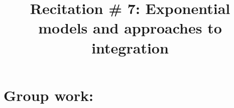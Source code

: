 \documentclass[handout]{ximera}
\title{Recitation \# 7: Exponential models and approaches to integration}
\begin{document}
\begin{abstract}		\end{abstract}
\maketitle

\section{Group work:}
\end{document}
